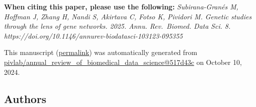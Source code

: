 { \textbf{When citing this paper, please use the following:}
\emph{Subirana-Granés M, Hoffman J, Zhang H, Nandi S, Akirtava C, Fotso K, Pividori M. Genetic studies through the lens of gene networks. 2025. Annu. Rev.~Biomed. Data Sci. 8. https://doi.org/10.1146/annurev-biodatasci-103123-095355}}

This manuscript
(\href{https://pivlab.github.io/annual_review_of_biomedical_data_science/v/517d43c379923fb79c0ec18f4a2aa10ed2beb727/}{permalink})
was automatically generated
from \href{https://github.com/pivlab/annual_review_of_biomedical_data_science/tree/517d43c379923fb79c0ec18f4a2aa10ed2beb727}{pivlab/annual\_review\_of\_biomedical\_data\_science@517d43c}
on October 10, 2024.

\hypertarget{authors}{%
\subsection{Authors}\label{authors}}

